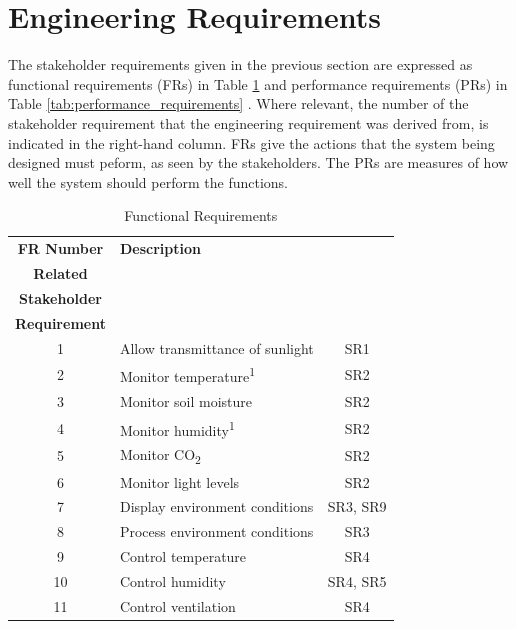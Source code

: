 \section{Engineering Requirements}

The stakeholder requirements given in the previous section are expressed
as functional requirements (FRs) in Table \ref{tab:functional_requirements} and performance requirements (PRs) in Table \ref{tab:performance_requirements} . Where relevant, the number of the stakeholder requirement that the engineering requirement was derived from, is indicated in the right-hand column. FRs give the actions that the system being designed must peform, as seen by the stakeholders. The PRs are measures
of how well the system should perform the functions. 

\begin{table}[H]
\centering
\small
\caption{Functional Requirements}
\label{tab:functional_requirements}
\renewcommand{\arraystretch}{1.2}
\begin{tabular}{|c|p{8cm}|c|}
\hline
\textbf{FR Number} & \textbf{Description} & \shortstack{\textbf{} \\\textbf{Related} \\ \textbf{Stakeholder} \\ \textbf{Requirement}} \\
\hline
1  & Allow transmittance of sunlight                        & SR1 \\
\hline
2  & Monitor temperature\textsuperscript{1}                & SR2 \\
\hline
3  & Monitor soil moisture                                  & SR2 \\
\hline
4  & Monitor humidity\textsuperscript{1}                   & SR2 \\
\hline
5  & Monitor CO\textsubscript{2}                            & SR2 \\
\hline
6  & Monitor light levels                                   & SR2 \\
\hline
7  & Display environment conditions                         & SR3, SR9 \\
\hline
8  & Process environment conditions                         & SR3 \\
\hline
9  & Control temperature                                     & SR4 \\
\hline
10 & Control humidity                                        & SR4, SR5 \\
\hline
11 & Control ventilation                                     & SR4 \\

\end{tabular}
\end{table}
